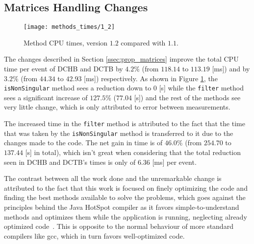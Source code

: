 \subsection{Matrices Handling Changes} \label{ssec:val_matrices}

    \begin{figure}[ht]
        \centering
        \texttt{[image: methods\_times/1\_2]}
        \caption{\label{fig:methods_times-1_2} Method CPU times, version $1.2$ compared with $1.1$.}
    \end{figure}

The changes described in Section \ref{ssec:prop_matrices} improve the total CPU time per event of DCHB and DCTB by $4.2\%$ (from $118.14$ to $113.19$ [ms]) and by $3.2\%$ (from $44.34$ to $42.93$ [ms]) respectively.
As shown in Figure \ref{fig:methods_times-1_2}, the \texttt{isNonSingular} method sees a reduction down to $0$ [s] while the \texttt{filter} method sees a significant increase of $127.5\%$ ($77.04$ [s]) and the rest of the methods see very little change, which is only attributed to error between measurements.

The increased time in the \texttt{filter} method is attributed to the fact that the time that was taken by the \texttt{isNonSingular} method is transferred to it due to the changes made to the code. %
The net gain in time is of $46.0\%$ (from $254.70$ to $137.44$ [s] in total), which isn't great when considering that the total reduction seen in DCHB and DCTB's times is only of $6.36$ [ms] per event.

The contrast between all the work done and the unremarkable change is attributed to the fact that this work is focused on finely optimizing the code and finding the best methods available to solve the problems, which goes against the principles behind the Java HotSpot compiler as it favors simple-to-understand methods and optimizes them while the application is running, neglecting already optimized code~\cite{meloan1999java}.
This is opposite to the normal behaviour of more standard compilers like gcc, which in turn favors well-optimized code. %

